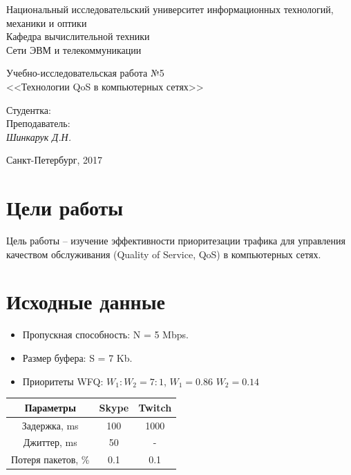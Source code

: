 \documentclass[12pt, a4paper] {ncc}
\begin{document}
\setcounter{figure}{0}
\frenchspacing
\pagestyle{empty}
\begin{center}
     Национальный исследовательский университет информационных технологий,
                              механики и оптики\\
                        Кафедра вычислительной техники\\
                          Сети ЭВМ и телекоммуникации
\end{center}
\begin{center}
                            Учебно-исследовательская работа №5\\
                <<Технологии QoS в компьютерных сетях>>
\end{center}
\begin{flushright}
                                          Студентка:\\
										  Преподаватель:\\
														 {\it Шинкарук Д.Н. }
\end{flushright}
\begin{center}
                             Санкт-Петербург, 2017
\end{center}
\newpage

\section*{Цели работы}
    Цель работы -- изучение эффективности приоритезации трафика для управления качеством обслуживания
	(Quality of Service, QoS) в компьютерных сетях.     

\section*{Исходные данные}

	\begin{itemize}
		\item Пропускная способность: N = 5 Mbps.
        \item Размер буфера: S = 7 Kb.
		\item Приоритеты WFQ: $W_1:W_2 = 7:1$, $W_1 = 0.86$ $W_2 = 0.14$
	\end{itemize}

	\begin{table}[h!]
		\begin{tabular}{|c|c|c|}
			\hline
			Параметры	       & Skype & Twitch  \\ \hline
			Задержка, ms       & 100   &  1000   \\ \hline
			Джиттер, ms        & 50    &  -  	 \\	\hline
			Потеря пакетов, \% & 0.1   & 0.1     \\ \hline
		\end{tabular}
	\end{table}
\end{document}
